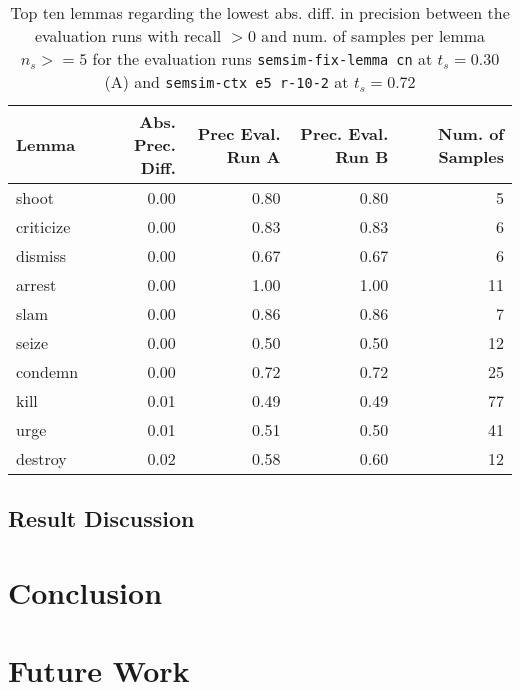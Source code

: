 \documentclass[11pt]{scrreprt}
\begin{document}
\begin{table}[ht]
\centering
\begin{tabular}{lrrrr}
\toprule
Lemma      & Abs. Prec. Diff. & Prec Eval. Run A & Prec. Eval. Run B & Num. of Samples \\
\midrule
shoot      & 0.00          & 0.80           & 0.80           & 5               \\
criticize  & 0.00          & 0.83           & 0.83           & 6               \\
dismiss    & 0.00          & 0.67           & 0.67           & 6               \\
arrest     & 0.00          & 1.00           & 1.00           & 11              \\
slam       & 0.00          & 0.86           & 0.86           & 7               \\
seize      & 0.00          & 0.50           & 0.50           & 12              \\
condemn    & 0.00          & 0.72           & 0.72           & 25              \\
kill       & 0.01          & 0.49           & 0.49           & 77              \\
urge       & 0.01          & 0.51           & 0.50           & 41              \\
destroy    & 0.02          & 0.58           & 0.60           & 12              \\
\bottomrule
\end{tabular}
\caption{Top ten lemmas regarding the lowest abs. diff. in precision between the evaluation runs with recall \(> 0\) and num. of samples per lemma \(n_s >= 5\) for the evaluation runs \texttt{semsim-fix-lemma cn} at \(t_s = 0.30\) (A) and \texttt{semsim-ctx e5 r-10-2} at \(t_s = 0.72\) }
\label{tab:predicate-lemma-lowest-precision}
\end{table}



\section{Result Discussion}
\label{sec:result-discussion}


\chapter{Conclusion}

\chapter{Future Work}
\end{document}
